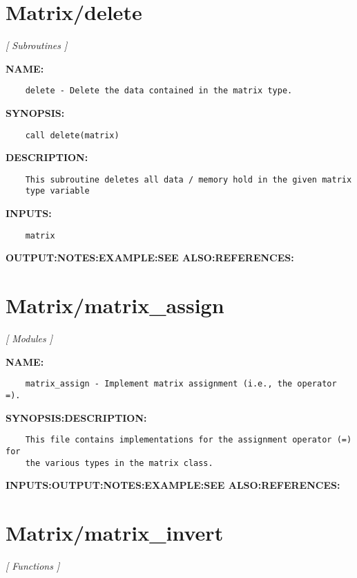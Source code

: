 \section{Matrix/delete}
\textsl{[ Subroutines ]}

\label{ch:robo26}
\label{ch:Matrix_delete}
\textbf{NAME:}\hspace{0.08in}\begin{Verbatim}
    delete - Delete the data contained in the matrix type.
\end{Verbatim}
\textbf{SYNOPSIS:}\hspace{0.08in}\begin{Verbatim}
    call delete(matrix)
\end{Verbatim}
\textbf{DESCRIPTION:}\hspace{0.08in}\begin{Verbatim}
    This subroutine deletes all data / memory hold in the given matrix
    type variable
\end{Verbatim}
\textbf{INPUTS:}\hspace{0.08in}\begin{Verbatim}
    matrix
\end{Verbatim}
\textbf{OUTPUT:}\hspace{0.08in}\textbf{NOTES:}\hspace{0.08in}\textbf{EXAMPLE:}\hspace{0.08in}\textbf{SEE ALSO:}\hspace{0.08in}\textbf{REFERENCES:}\hspace{0.08in}\section{Matrix/matrix\_assign}
\textsl{[ Modules ]}

\label{ch:robo27}
\label{ch:Matrix_matrix_assign}
\textbf{NAME:}\hspace{0.08in}\begin{Verbatim}
    matrix_assign - Implement matrix assignment (i.e., the operator =).
\end{Verbatim}
\textbf{SYNOPSIS:}\hspace{0.08in}\textbf{DESCRIPTION:}\hspace{0.08in}\begin{Verbatim}
    This file contains implementations for the assignment operator (=) for
    the various types in the matrix class.
\end{Verbatim}
\textbf{INPUTS:}\hspace{0.08in}\textbf{OUTPUT:}\hspace{0.08in}\textbf{NOTES:}\hspace{0.08in}\textbf{EXAMPLE:}\hspace{0.08in}\textbf{SEE ALSO:}\hspace{0.08in}\textbf{REFERENCES:}\hspace{0.08in}\section{Matrix/matrix\_invert}
\textsl{[ Functions ]}

